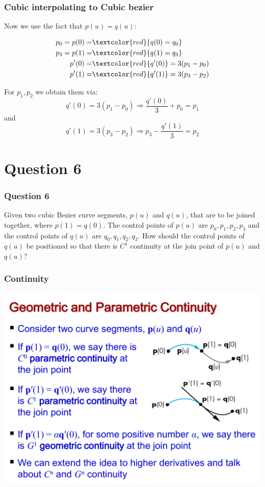 \documentclass{beamer}
\begin{document}
\begin{frame}
    \frametitle{Cubic interpolating to Cubic bezier}

    Now we use the fact that $p(u) = q(u)$:

    \begin{eqnarray*}
        p_0 = p(0) =& \textcolor{red}{q(0) = q_0}\\
        p_3 = p(1) =& \textcolor{red}{q(1) = q_3}\\
        p'(0) =& \textcolor{red}{q'(0)} = 3(p_1 - p_0)\\
        p'(1) =& \textcolor{red}{q'(1)} = 3(p_3 - p_2)\\
    \end{eqnarray*}

    For $p_1, p_2$ we obtain them via:
    \begin{equation*}
        q'(0) = 3(p_1 - p_0) \Rightarrow \frac{q'(0)}{3} + p_0 = p_1
    \end{equation*}
    and
    \begin{equation*}
        q'(1) = 3(p_3 - p_2) \Rightarrow p_3 - \frac{q'(1)}{3} = p_2
    \end{equation*}
\end{frame}

\section{Question 6}

\begin{frame}
    \frametitle{Question 6}
    Given two cubic Bezier curve segments, $p(u)$ and $q(u)$, that are to be joined together, where $p(1) = q(0)$. 
    The control points of $p(u)$ are $p_0, p_1, p_2, p_3$ and the control points of $q(u)$ are $q_0, q_1, q_2, q_3$. 
    How should the control points of $q(u)$ be positioned so that there is $C^1$ continuity at the join point of $p(u)$ and $q(u)$?
\end{frame}

\begin{frame}
    \frametitle{Continuity}

    \centering
    \includegraphics[scale=0.3]{continuity.png}

\end{frame}
\end{document}
